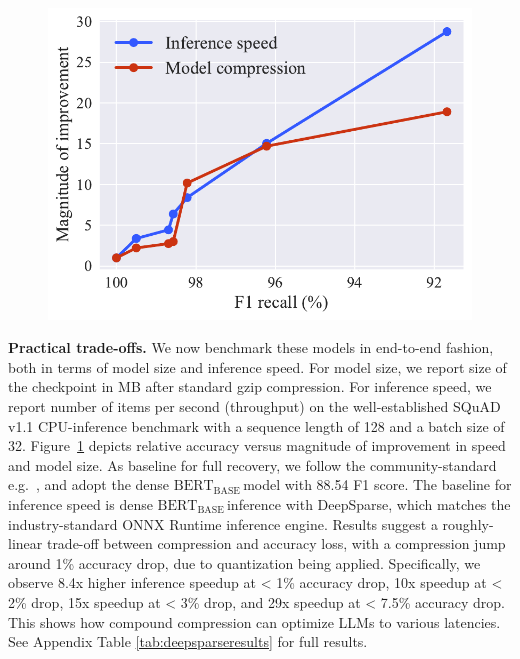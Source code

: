 \documentclass[11pt]{article}
\newcommand{\bert}{$\textrm{BERT}_{\textrm{BASE}}\,$}
\begin{document}
\begin{figure}
    \centering
    \includegraphics[scale=0.5]{media/inf_vs_comp.pdf}
    \label{fig:inference}
    \vspace{-0.2in}
\end{figure}

\noindent\textbf{Practical trade-offs.} We now benchmark these models in end-to-end fashion, both in terms of model size and inference speed. For model size, we report size of the checkpoint in MB after standard gzip compression. For inference speed, we report number of items per second (throughput) on the well-established SQuAD v1.1 CPU-inference benchmark with a sequence length of 128 and a batch size of 32. Figure~\ref{fig:inference} depicts relative accuracy versus magnitude of improvement in speed and model size. As baseline for full recovery, we follow the community-standard e.g.~\cite{Sanh2020MovementPA}, and adopt the dense \bert model with 88.54 F1 score. The baseline for inference speed is dense \bert inference with DeepSparse, which matches the industry-standard ONNX Runtime inference engine. Results suggest a roughly-linear trade-off between compression and accuracy loss, with a compression jump around 1\% accuracy drop, due to quantization being applied. Specifically, we observe 8.4x higher inference speedup at < 1\% accuracy drop, 10x speedup at < 2\% drop, 15x speedup at < 3\% drop, and 29x speedup at < 7.5\% accuracy drop. This shows how compound compression can optimize LLMs to various latencies. See Appendix Table \ref{tab:deepsparseresults} for full results.
\end{document}
